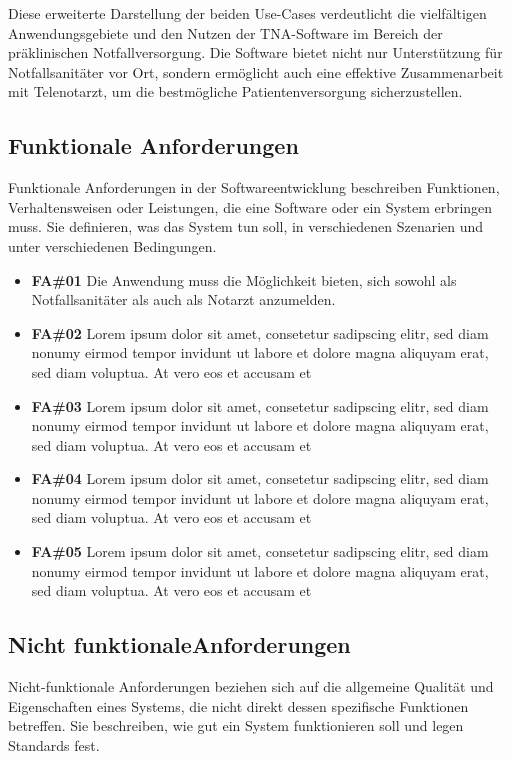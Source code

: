 Diese erweiterte Darstellung der beiden Use-Cases verdeutlicht die vielfältigen Anwendungsgebiete und den Nutzen der TNA-Software im Bereich der präklinischen Notfallversorgung. Die Software bietet nicht nur Unterstützung für Notfallsanitäter vor Ort, sondern ermöglicht auch eine effektive Zusammenarbeit mit Telenotarzt, um die bestmögliche Patientenversorgung sicherzustellen.


\subsection{Funktionale Anforderungen}
Funktionale Anforderungen in der Softwareentwicklung beschreiben Funktionen, Verhaltensweisen oder Leistungen, die eine Software oder ein System erbringen muss. 
Sie definieren, was das System tun soll, in verschiedenen Szenarien und unter verschiedenen Bedingungen. \cite{braun2016nicht}\\

\begin{itemize}
    \item \textbf{FA\#01} Die Anwendung muss die Möglichkeit bieten, sich sowohl als Notfallsanitäter als auch als Notarzt anzumelden.
    \item \textbf{FA\#02} Lorem ipsum dolor sit amet, consetetur sadipscing elitr, sed diam nonumy eirmod tempor invidunt ut labore et dolore magna aliquyam erat, sed diam voluptua. At vero eos et accusam et
    \item \textbf{FA\#03} Lorem ipsum dolor sit amet, consetetur sadipscing elitr, sed diam nonumy eirmod tempor invidunt ut labore et dolore magna aliquyam erat, sed diam voluptua. At vero eos et accusam et
    \item \textbf{FA\#04} Lorem ipsum dolor sit amet, consetetur sadipscing elitr, sed diam nonumy eirmod tempor invidunt ut labore et dolore magna aliquyam erat, sed diam voluptua. At vero eos et accusam et
    \item \textbf{FA\#05} Lorem ipsum dolor sit amet, consetetur sadipscing elitr, sed diam nonumy eirmod tempor invidunt ut labore et dolore magna aliquyam erat, sed diam voluptua. At vero eos et accusam et

\end{itemize}

\subsection{Nicht funktionaleAnforderungen}
Nicht-funktionale Anforderungen beziehen sich auf die allgemeine Qualität und Eigenschaften eines Systems, die nicht direkt dessen spezifische Funktionen betreffen. Sie beschreiben, wie gut ein System funktionieren soll und legen Standards fest. \cite{bergsmann2004nicht}

